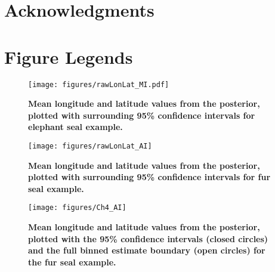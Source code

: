 \documentclass[10pt]{article}
\begin{document}
\section*{Acknowledgments}



\section*{Figure Legends}


\begin{figure}[htbp]
  \begin{center}
\texttt{[image: figures/rawLonLat\_MI.pdf]}
\end{center}
\caption{
{\bf Mean longitude and latitude values from the posterior,
  plotted with surrounding 95\% confidence intervals for elephant seal
  example.}
 }
  \label{fig:rawlonlat_MI}
\end{figure}


\begin{figure}[htbp]
  \begin{center}
\texttt{[image: figures/rawLonLat\_AI]}
\end{center}
\caption{
{\bf Mean longitude and latitude values from the posterior,
  plotted with surrounding 95\% confidence intervals for fur seal
  example.}
}
  \label{fig:rawlonlat_AI}
\end{figure}

\begin{figure}[htbp]
  \begin{center}
\texttt{[image: figures/Ch4\_AI]}
\end{center}
\caption{
{\bf Mean longitude and latitude values from the posterior,
  plotted with the 95\% confidence intervals (closed circles) and the
  full binned estimate boundary (open circles) for the fur seal
  example. }
}
  \label{fig:locationPrecisionAI}
\end{figure}
\end{document}
